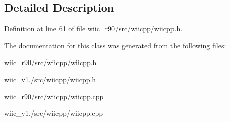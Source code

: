 \subsection{Detailed Description}


Definition at line 61 of file wiic\-\_\-r90/src/wiicpp/wiicpp.\-h.



The documentation for this class was generated from the following files\-:\begin{DoxyCompactItemize}
\item 
wiic\-\_\-r90/src/wiicpp/wiicpp.\-h\item 
wiic\-\_\-v1./src/wiicpp/wiicpp.\-h\item 
wiic\-\_\-r90/src/wiicpp/wiicpp.\-cpp\item 
wiic\-\_\-v1./src/wiicpp/wiicpp.\-cpp\end{DoxyCompactItemize}
